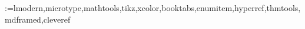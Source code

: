 \newif\ifkqboxed      \kqboxedtrue


\makeatletter
\@for\kq@pkg:=lmodern,microtype,mathtools,tikz,xcolor,booktabs,enumitem,hyperref,thmtools,mdframed,cleveref
\makeatother


\usepackage[a4paper,margin=3.0cm]{geometry}

\usepackage{lmodern}
\usepackage[T1]{fontenc}

\usepackage{microtype}


\usepackage{amsmath,amssymb,amsthm}
\usepackage{mathtools}

